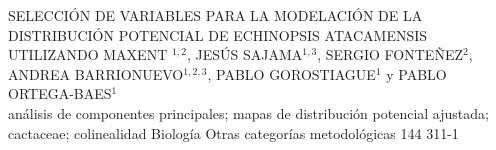 \A
{SELECCIÓN DE VARIABLES PARA LA MODELACIÓN DE LA DISTRIBUCIÓN POTENCIAL DE ECHINOPSIS ATACAMENSIS UTILIZANDO MAXENT}
{$^{1, 2}$, JESÚS SAJAMA$^{1, 3}$, SERGIO FONTEÑEZ$^2$, ANDREA BARRIONUEVO$^{1, 2, 3}$, PABLO GOROSTIAGUE$^1$ y PABLO ORTEGA-BAES$^1$}
{
\\}
{análisis de componentes principales; mapas de distribución potencial ajustada; cactaceae; colinealidad} 
 {Biología} 
 {Otras categorías metodológicas} 
 {144} 
 {311-1}
